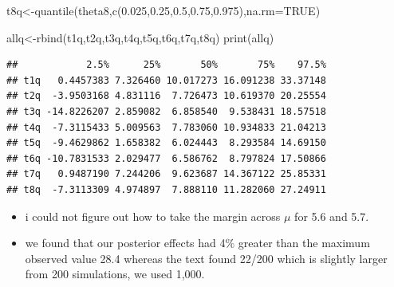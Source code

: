 \documentclass[
]{book}
\newenvironment{Shaded}{\begin{snugshade}}{\end{snugshade}}
\newcommand{\AttributeTok}[1]{\textcolor[rgb]{0.77,0.63,0.00}{#1}}
\newcommand{\ConstantTok}[1]{\textcolor[rgb]{0.00,0.00,0.00}{#1}}
\newcommand{\FloatTok}[1]{\textcolor[rgb]{0.00,0.00,0.81}{#1}}
\newcommand{\FunctionTok}[1]{\textcolor[rgb]{0.00,0.00,0.00}{#1}}
\newcommand{\NormalTok}[1]{#1}
\newcommand{\OtherTok}[1]{\textcolor[rgb]{0.56,0.35,0.01}{#1}}
\theoremstyle{definition}
\theoremstyle{definition}
\theoremstyle{definition}
\theoremstyle{definition}
\theoremstyle{remark}
\begin{document}
\begin{Shaded}
\begin{Highlighting}[]
\NormalTok{  t8q}\OtherTok{\textless{}{-}}\FunctionTok{quantile}\NormalTok{(theta8,}\FunctionTok{c}\NormalTok{(}\FloatTok{0.025}\NormalTok{,}\FloatTok{0.25}\NormalTok{,}\FloatTok{0.5}\NormalTok{,}\FloatTok{0.75}\NormalTok{,}\FloatTok{0.975}\NormalTok{),}\AttributeTok{na.rm=}\ConstantTok{TRUE}\NormalTok{)}

\NormalTok{ allq}\OtherTok{\textless{}{-}}\FunctionTok{rbind}\NormalTok{(t1q,t2q,t3q,t4q,t5q,t6q,t7q,t8q)}
 \FunctionTok{print}\NormalTok{(allq)}
\end{Highlighting}
\end{Shaded}

\begin{verbatim}
##            2.5%      25%       50%       75%    97.5%
## t1q   0.4457383 7.326460 10.017273 16.091238 33.37148
## t2q  -3.9503168 4.831116  7.726473 10.619370 20.25554
## t3q -14.8226207 2.859082  6.858540  9.538431 18.57518
## t4q  -7.3115433 5.009563  7.783060 10.934833 21.04213
## t5q  -9.4629862 1.658382  6.024443  8.293584 14.69150
## t6q -10.7831533 2.029477  6.586762  8.797824 17.50866
## t7q   0.9487190 7.244206  9.623687 14.367122 25.85331
## t8q  -7.3113309 4.974897  7.888110 11.282060 27.24911
\end{verbatim}

\begin{itemize}
\item
  i could not figure out how to take the margin across \(\mu\) for 5.6 and 5.7.
\item
  we found that our posterior effects had 4\(\%\) greater than the maximum observed value 28.4 whereas the text found 22/200 which is slightly larger from 200 simulations, we used 1,000.
\end{itemize}
\end{document}
